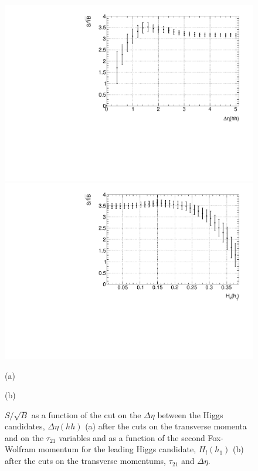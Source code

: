 \begin{figure}
	\centering
	\begin{minipage}{.5\textwidth}
		\centering
		\includegraphics[trim={.6cm 0 0 0},clip,width=\linewidth]{./Figures/SSB_hh_deltaEta.pdf}
	\end{minipage}%
	\begin{minipage}{.5\textwidth}
		\centering
		\includegraphics[trim={0 0 .6cm 0},clip,width=\linewidth]{./Figures/SSB_h1_FW2.pdf}
	\end{minipage}
	\begin{minipage}[t]{0.5\textwidth}
		\caption*{(a)}
	\end{minipage}%
	\hfill
	\begin{minipage}[t]{0.5\textwidth}
		\caption*{(b)}
	\end{minipage}
	\caption{$S/\sqrt{B}$ as a function of the cut on the $\Delta\eta$ between the Higgs candidates, $\Delta\eta(hh)$ (a) after the cuts on the transverse momenta and on the $\tau_{21}$ variables and as a function of the second Fox-Wolfram momentum for the leading Higgs candidate, $H_l(h_1)$ (b) after the cuts on the transverse momentums, $\tau_{21}$ and $\Delta\eta$.}
	\label{fig:SSB_hh_deltaEta}
\end{figure} 

